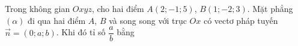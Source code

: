 \begin{ex}
Trong không gian $Oxyz$, cho hai điểm $A(2;-1;5)$, $B(1;-2;3)$. Mặt phẳng $(\alpha)$ đi qua hai điểm $A$, $B$ và song song với trục $Ox$ có vectơ pháp tuyến $\vec n=(0;a;b)$. Khi đó tỉ số $\dfrac ab$ bằng
\end{ex}
